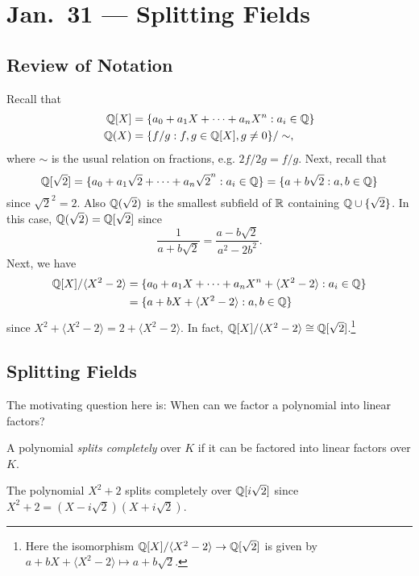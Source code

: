 \chapter{Jan.~31 --- Splitting Fields}

\section{Review of Notation}
Recall that
\begin{align*}
  \mathbb{Q}[X] &= \{
    a_0 + a_1 X + \dotsb + a_n X^n : a_i \in \mathbb{Q}
  \} \\
    \mathbb{Q}(X) &= \{
      f / g : f, g \in \mathbb{Q}[X], g \ne 0
    \} / \sim,
\end{align*}
where $\sim$ is the usual relation on fractions, e.g.
$2f / 2g = f / g$. Next, recall that
\[
  \mathbb{Q}[\sqrt{2}] = \{a_0 + a_1 \sqrt{2} + \dots + a_n \sqrt{2}^n : a_i \in \mathbb{Q}\}
  = \{a + b \sqrt{2} : a, b \in \mathbb{Q}\}
\]
since $\sqrt{2}^2 = 2$. Also
$\mathbb{Q}(\sqrt{2})$ is the smallest subfield of $\mathbb{R}$
containing $\mathbb{Q} \cup \{\sqrt{2}\}$. In this case,
$\mathbb{Q}(\sqrt{2}) = \mathbb{Q}[\sqrt{2}]$ since
\[
  \frac{1}{a + b\sqrt{2}} = \frac{a - b\sqrt{2}}{a^2 - 2b^2}.
\]
Next, we have
\begin{align*}
  \mathbb{Q}[X] / \langle X^2 - 2 \rangle
  &= \{
    a_0 + a_1 X + \dots + a_n X^n + \langle X^2 - 2 \rangle : a_i \in \mathbb{Q}
  \} \\
  &= \{
    a + bX + \langle X^2 - 2 \rangle : a, b \in \mathbb{Q}
  \}
\end{align*}
since $X^2 + \langle X^2 - 2 \rangle = 2 + \langle X^2 - 2\rangle$.
In fact, $\mathbb{Q}[X] / \langle X^2 - 2 \rangle \cong \mathbb{Q}[\sqrt{2}]$.\footnote{Here the isomorphism $\mathbb{Q}[X] / \langle X^2 - 2 \rangle \to \mathbb{Q}[\sqrt{2}]$ is given by $a + bX  +\langle X^2 - 2 \rangle \mapsto a + b\sqrt{2}$.}

\section{Splitting Fields}
The motivating question here is: When can we factor
a polynomial into linear factors?

\begin{definition}
  A polynomial \emph{splits completely} over $K$
  if it can be factored into linear factors over $K$.
\end{definition}

\begin{example}
  The polynomial $X^2 + 2$ splits completely over
  $\mathbb{Q}[i\sqrt{2}]$ since $X^2 + 2 = (X - i\sqrt{2})(X + i\sqrt{2})$.
\end{example}

